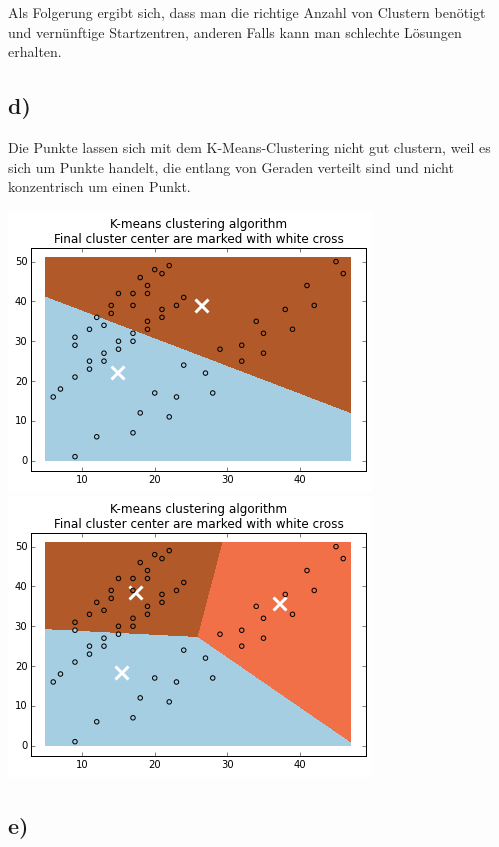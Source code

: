 \documentclass[a4paper,parskip=full-]{article}
\begin{document}
Als Folgerung ergibt sich, dass man die richtige Anzahl von Clustern benötigt und vernünftige Startzentren, anderen Falls kann man schlechte Lösungen erhalten.

\subsection{d)}
Die Punkte lassen sich mit dem K-Means-Clustering nicht gut clustern, weil es sich um Punkte handelt, die entlang von Geraden verteilt sind und nicht konzentrisch um einen Punkt.\\

\begin{minipage}{\textwidth}
	\includegraphics[scale=0.5]{spaeth_05_2clu.png}
	\includegraphics[scale=0.5]{spaeth_05_3clu.png}
\end{minipage}


\subsection{e)}
\end{document}
